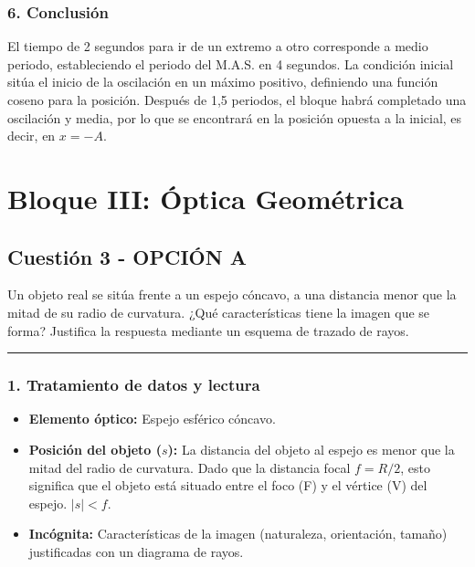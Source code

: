 \subsubsection*{6. Conclusión}
\begin{cajaconclusion}
El tiempo de 2 segundos para ir de un extremo a otro corresponde a medio periodo, estableciendo el periodo del M.A.S. en 4 segundos. La condición inicial sitúa el inicio de la oscilación en un máximo positivo, definiendo una función coseno para la posición. Después de 1,5 periodos, el bloque habrá completado una oscilación y media, por lo que se encontrará en la posición opuesta a la inicial, es decir, en $x=-A$.
\end{cajaconclusion}

\newpage

\section{Bloque III: Óptica Geométrica}
\label{sec:optica_2015_jul_ext}

\subsection{Cuestión 3 - OPCIÓN A}
\label{subsec:3A_2015_jul_ext}

\begin{cajaenunciado}
Un objeto real se sitúa frente a un espejo cóncavo, a una distancia menor que la mitad de su radio de curvatura. ¿Qué características tiene la imagen que se forma? Justifica la respuesta mediante un esquema de trazado de rayos.
\end{cajaenunciado}
\hrule

\subsubsection*{1. Tratamiento de datos y lectura}
\begin{itemize}
    \item \textbf{Elemento óptico:} Espejo esférico cóncavo.
    \item \textbf{Posición del objeto ($s$):} La distancia del objeto al espejo es menor que la mitad del radio de curvatura. Dado que la distancia focal $f = R/2$, esto significa que el objeto está situado entre el foco (F) y el vértice (V) del espejo. $|s| < f$.
    \item \textbf{Incógnita:} Características de la imagen (naturaleza, orientación, tamaño) justificadas con un diagrama de rayos.
\end{itemize}


